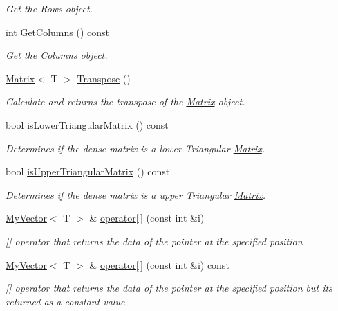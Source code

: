 \begin{DoxyCompactItemize}
\begin{DoxyCompactList}\small\item\em Get the Rows object. \end{DoxyCompactList}\item 
int \mbox{\hyperlink{class_matrix_ada60917bb197292e0645992e108c2c2f}{Get\+Columns}} () const
\begin{DoxyCompactList}\small\item\em Get the Columns object. \end{DoxyCompactList}\item 
\mbox{\hyperlink{class_matrix}{Matrix}}$<$ T $>$ \mbox{\hyperlink{class_matrix_a86d55a5db43b641f4e8fb2b302ccc599}{Transpose}} ()
\begin{DoxyCompactList}\small\item\em Calculate and returns the transpose of the \mbox{\hyperlink{class_matrix}{Matrix}} object. \end{DoxyCompactList}\item 
bool \mbox{\hyperlink{class_matrix_a6e1df160cc8cb63f5b0bb58398b6e7ca}{is\+Lower\+Triangular\+Matrix}} () const
\begin{DoxyCompactList}\small\item\em Determines if the dense matrix is a lower Triangular \mbox{\hyperlink{class_matrix}{Matrix}}. \end{DoxyCompactList}\item 
bool \mbox{\hyperlink{class_matrix_a3d177e2d4c6d8ccf7a1c4c651f4bc075}{is\+Upper\+Triangular\+Matrix}} () const
\begin{DoxyCompactList}\small\item\em Determines if the dense matrix is a upper Triangular \mbox{\hyperlink{class_matrix}{Matrix}}. \end{DoxyCompactList}\item 
\mbox{\hyperlink{class_my_vector}{My\+Vector}}$<$ T $>$ \& \mbox{\hyperlink{class_matrix_aa9532c87a69bef256954e2309ca3fdd6}{operator\mbox{[}$\,$\mbox{]}}} (const int \&i)
\begin{DoxyCompactList}\small\item\em \mbox{[}\mbox{]} operator that returns the data of the pointer at the specified position \end{DoxyCompactList}\item 
\mbox{\hyperlink{class_my_vector}{My\+Vector}}$<$ T $>$ \& \mbox{\hyperlink{class_matrix_a56c7f18f272e74bee2b616eba702fc87}{operator\mbox{[}$\,$\mbox{]}}} (const int \&i) const
\begin{DoxyCompactList}\small\item\em \mbox{[}\mbox{]} operator that returns the data of the pointer at the specified position but its returned as a constant value \end{DoxyCompactList}\item 

\end{DoxyCompactItemize}
